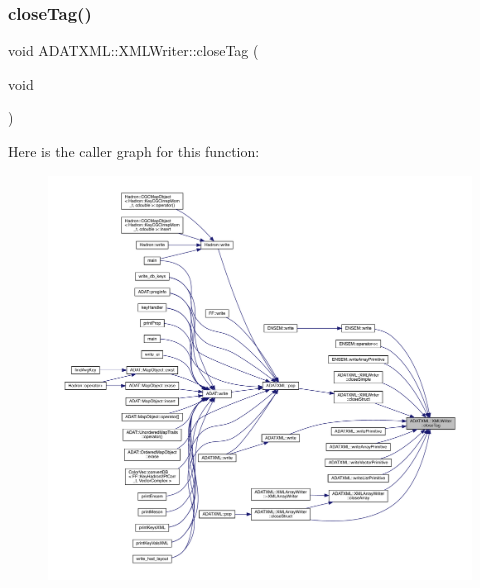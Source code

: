 \mbox{\label{classADATXML_1_1XMLWriter_a13209ef7863272707bf8fea7c172e9f1}} 
\subsubsection{\texorpdfstring{closeTag()}{closeTag()}\hspace{0.1cm}{\footnotesize\ttfamily [1/3]}}
{\footnotesize\ttfamily void A\+D\+A\+T\+X\+M\+L\+::\+X\+M\+L\+Writer\+::close\+Tag (\begin{DoxyParamCaption}\item[{void}]{ }\end{DoxyParamCaption})}

Here is the caller graph for this function\+:
\nopagebreak
\begin{figure}[H]
\begin{center}
\leavevmode
\includegraphics[width=350pt]{da/da7/classADATXML_1_1XMLWriter_a13209ef7863272707bf8fea7c172e9f1_icgraph}
\end{center}
\end{figure}
\mbox{\label{classADATXML_1_1XMLWriter_a13209ef7863272707bf8fea7c172e9f1}} 

